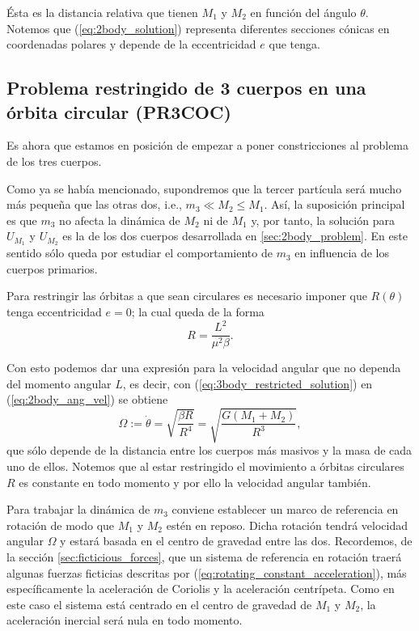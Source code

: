 Ésta es la distancia relativa que tienen $M_1$ y $M_2$ en función del ángulo $\theta$. Notemos que (\ref{eq:2body_solution}) representa diferentes secciones cónicas en coordenadas polares y depende de la eccentricidad $e$ que tenga. 

\subsection{Problema restringido de 3 cuerpos en una órbita circular (PR3COC)}

Es ahora que estamos en posición de empezar a poner constricciones al problema de los tres cuerpos. 

Como ya se había mencionado, supondremos que la tercer partícula será mucho más pequeña que las otras dos, i.e., $m_3 \ll M_2 \leq M_1$. Así, la suposición principal es que $m_3$ no afecta la dinámica de $M_2$ ni de $M_1$ y, por tanto, la solución para $U_{M_1}$ y $U_{M_2}$ es la de los dos cuerpos desarrollada en \ref{sec:2body_problem}. En este sentido sólo queda por estudiar el comportamiento de $m_3$ en influencia de los cuerpos primarios.

Para restringir las órbitas a que sean circulares es necesario imponer que $R(\theta)$ tenga eccentricidad $e=0$; la cual queda de la forma
\begin{equation}
 R = \frac{L^2}{\mu^2 \beta}.
 \label{eq:3body_restricted_solution}
\end{equation} 

Con esto podemos dar una expresión para la velocidad angular que no dependa del momento angular $L$, es decir, con (\ref{eq:3body_restricted_solution}) en (\ref{eq:2body_ang_vel}) se obtiene
\begin{equation}
 \Omega := \dot{\theta} = \sqrt{ \frac{\beta R}{R^4} } = \sqrt{\frac{G \left(M_1 + M_2 \right)}{R^3}},
 \label{eq:3body_ang_velocity}
\end{equation}
que sólo depende de la distancia entre los cuerpos más masivos y la masa de cada uno de ellos. Notemos que al estar restringido el movimiento a órbitas circulares $R$ es constante en todo momento y por ello la velocidad angular también.

Para trabajar la dinámica de $m_3$ conviene establecer un marco de referencia en rotación de modo que $M_1$ y $M_2$ estén en reposo. Dicha rotación tendrá velocidad angular $\Omega$ y estará basada en el centro de gravedad entre las dos. Recordemos, de la sección \ref{sec:ficticious_forces}, que un sistema de referencia en rotación traerá algunas fuerzas ficticias descritas por (\ref{eq:rotating_constant_acceleration}), más específicamente la aceleración de Coriolis y la aceleración centrípeta. Como en este caso el sistema está centrado en el centro de gravedad de $M_1$ y $M_2$, la aceleración inercial será nula en todo momento.

